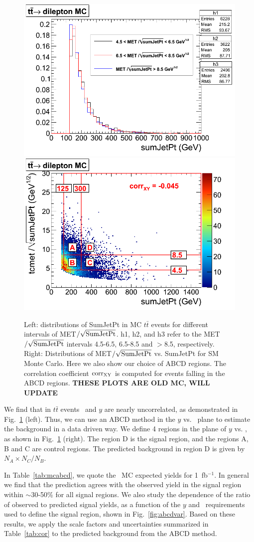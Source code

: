 \begin{figure}[hbt]
\begin{center}
\includegraphics[width=0.48\linewidth]{uncor.png}
\includegraphics[width=0.48\linewidth]{ttdil_uncor_38X.png}
\caption{\label{fig:uncor}\protect 
Left: distributions of SumJetPt 
in MC $t\bar{t}$ events for different intervals of 
MET$/\sqrt{\rm SumJetPt}$. h1, h2, and h3 refer to the MET$/\sqrt{\rm SumJetPt}$
intervals 4.5-6.5, 6.5-8.5 and $>$8.5, respectively. Right: 
Distributions of MET$/\sqrt{\rm SumJetPt}$ vs. 
SumJetPt for SM Monte Carlo.  Here we also show our choice of ABCD regions. The correlation coefficient
${\rm corr_{XY}}$ is computed for events falling in the ABCD regions.
{\bf THESE PLOTS ARE OLD MC, WILL UPDATE}
}
\end{center}
\end{figure}

We find that in $t\bar{t}$ events \Ht\ and 
$y$ are nearly uncorrelated, 
as demonstrated in Fig.~\ref{fig:uncor} (left).
Thus, we can use an ABCD method in the $y$ vs. \Ht\
plane to estimate the background in a data driven way. We define 4 regions in the 
plane of $y$ vs. \Ht, as shown in Fig.~\ref{fig:uncor} (right).
The region D is the signal region, and the regions A, B and C are control regions.
The predicted background in region D is given by $N_A \times N_C / N_B$.

In Table~\ref{tab:mcabcd}, we quote the \ttbar\ MC expected yields for 1~fb$^{-1}$. In
general we find that the prediction agrees with the observed yield in the signal region within
$\sim$30-50\% for all signal regions. We also study the dependence of the ratio
of observed to predicted signal yields, as a function of the $y$ and \Ht\
requirements used to define the signal region, shown in Fig.~\ref{fig:abcdvar}.
Based on these results, we apply the
scale factors and uncertainties summarized in Table~\ref{tab:cor} to the
predicted background from the ABCD method.


